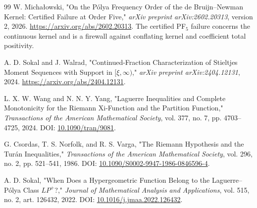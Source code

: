 \begin{thebibliography}{99}
W. Micha{\l}owski,
"On the P{\'o}lya Frequency Order of the de Bruijn--Newman Kernel: Certified Failure at Order Five,"
\emph{arXiv preprint arXiv:2602.20313}, version 2, 2026.
\url{https://arxiv.org/abs/2602.20313}.
The certified PF$_5$ failure concerns the continuous kernel and is a firewall against conflating kernel and coefficient total positivity.

A. D. Sokal and J. Walrad,
"Continued-Fraction Characterization of Stieltjes Moment Sequences with Support in $[\xi,\infty)$,"
\emph{arXiv preprint arXiv:2404.12131}, 2024.
\url{https://arxiv.org/abs/2404.12131}.

L. X. W. Wang and N. N. Y. Yang,
"Laguerre Inequalities and Complete Monotonicity for the Riemann Xi-Function and the Partition Function,"
\emph{Transactions of the American Mathematical Society}, vol. 377, no. 7, pp. 4703--4725, 2024.
DOI: \href{https://doi.org/10.1090/tran/9081}{10.1090/tran/9081}.


G. Csordas, T. S. Norfolk, and R. S. Varga,
"The Riemann Hypothesis and the Tur{\'a}n Inequalities,"
\emph{Transactions of the American Mathematical Society}, vol. 296, no. 2, pp. 521--541, 1986.
DOI: \href{https://doi.org/10.1090/S0002-9947-1986-0846596-4}{10.1090/S0002-9947-1986-0846596-4}.


A. D. Sokal,
"When Does a Hypergeometric Function Belong to the Laguerre--P{\'o}lya Class $LP^+$?,"
\emph{Journal of Mathematical Analysis and Applications}, vol. 515, no. 2, art. 126432, 2022.
DOI: \href{https://doi.org/10.1016/j.jmaa.2022.126432}{10.1016/j.jmaa.2022.126432}.

\end{thebibliography}
